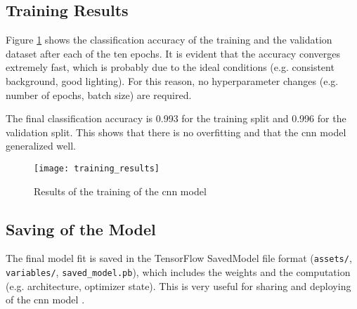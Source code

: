 \subsection{Training Results}
\label{subsec:training_of_the_cnn:training:training_results}
Figure \ref{fig:training_results} shows the classification accuracy of the training and the validation dataset after each of the ten epochs.
It is evident that the accuracy converges extremely fast, which is probably due to the ideal conditions (e.g. consistent background, good lighting).
For this reason, no hyperparameter changes (e.g. number of epochs, batch size) are required.

The final classification accuracy is \num{0.993} for the training split and \num{0.996} for the validation split.
This shows that there is no overfitting and that the \acrshort{cnn} model generalized well.

\begin{figure}
  \centering
  \texttt{[image: training\_results]}
  \caption{Results of the training of the \acrshort{cnn} model}
  \label{fig:training_results}
\end{figure}

\subsection{Saving of the Model}
\label{subsec:training_of_the_cnn:training:saving_of_the_model}
The final model fit is saved in the TensorFlow SavedModel file format (\texttt{assets/}, \texttt{variables/}, \texttt{saved\_model.pb}), which includes the weights and the computation (e.g. architecture, optimizer state).
This is very useful for sharing and deploying of the \acrshort{cnn} model \cite{training_train_tf_keras_saving_loading}.

